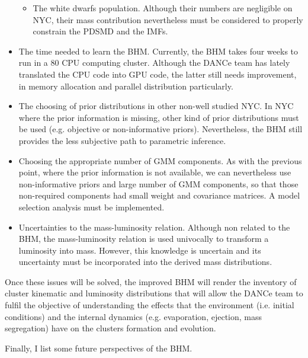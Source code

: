 \begin{itemize}
\begin{itemize}
\item The white dwarfs population. Although their numbers are negligible on NYC, their mass contribution nevertheless must be considered to properly constrain the PDSMD and the IMFs. 
\end{itemize}
\item The time needed to learn the BHM. Currently, the BHM takes four weeks to run in a 80 CPU computing cluster. Although the DANCe team has lately translated the CPU code into GPU code, the latter still needs improvement, in memory allocation and parallel distribution particularly.
\item The choosing of prior distributions in other non-well studied NYC. In NYC where the prior information is missing, other kind of prior distributions must be used (e.g. objective or non-informative priors). Nevertheless, the BHM still provides the less subjective path to parametric inference.
\item Choosing the appropriate number of GMM components. As with the previous point, where the prior information is not available, we can nevertheless use non-informative priors and large number of GMM components, so that those non-required components had small weight and covariance matrices. A model selection analysis must be implemented.
\item Uncertainties to the mass-luminosity relation. Although non related to the BHM, the mass-luminosity relation is used univocally to transform a luminosity into mass. However, this knowledge is uncertain and its uncertainty must be incorporated into the derived mass distributions.
\end{itemize}

Once these issues will be solved, the improved BHM will render the inventory of cluster kinematic and luminosity distributions that will allow the DANCe team to fulfil the objective of understanding the effects that the environment (i.e. initial conditions) and the internal dynamics (e.g. evaporation, ejection, mass segregation) have on the clusters formation and evolution.

Finally, I  list some future perspectives of the BHM.

